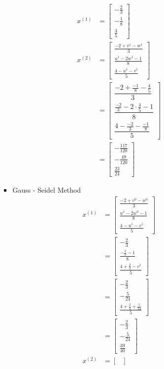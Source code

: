 \documentclass{article}
\begin{document}
\begin{enumerate}
\begin{enumerate}
\begin{itemize}
\begin{align*}
x^{(1)}&= \begin{bmatrix}
-\frac{2}{3}\\
-\frac{1}{8}\\
\frac{4}{5}
\end{bmatrix}\\
x^{(2)}&= \begin{bmatrix}
\frac{-2+v^1-w^1}{3}\\
\frac{u^1-2w^1-1}{8}\\
\frac{4-u^1-v^1}{5}
\end{bmatrix}\\
&=\begin{bmatrix}
\dfrac{-2+\frac{-1}{8}-\frac{4}{5}}{3}\\
\dfrac{\frac{-2}{3}-2\cdot \frac{4}{5}-1}{8}\\
\dfrac{4-\frac{-2}{3}-\frac{-1}{8}}{5}
\end{bmatrix}\\
&=\begin{bmatrix}
-\frac{117}{120}\\-\frac{49}{120}\\\frac{23}{24}
\end{bmatrix}
\end{align*}
\item  Gauss - Seidel Method
\begin{align*}
x^{(1)}&= \begin{bmatrix}
\frac{-2+v^0-w^0}{3}\\
\frac{u^1-2w^0-1}{8}\\
\frac{4-u^1-v^1}{5}
\end{bmatrix}\\
&=\begin{bmatrix}
-\frac{2}{3}\\
\frac{-\frac{2}{3}-1}{8}\\
\frac{4+\frac{2}{3}-v^1}{5}
\end{bmatrix}\\
&=\begin{bmatrix}
-\frac{2}{3}\\
-\frac{5}{24}\\
\frac{4+\frac{2}{3}+\frac{5}{24}}{5}
\end{bmatrix}\\
&=\begin{bmatrix}
-\frac{2}{3}\\
-\frac{5}{24}\\
\frac{39}{40}
\end{bmatrix}\\
x^{(2)}&= \begin{bmatrix}

\end{bmatrix}
\end{align*}
\end{itemize}
\end{enumerate}
\end{enumerate}
\end{document}
